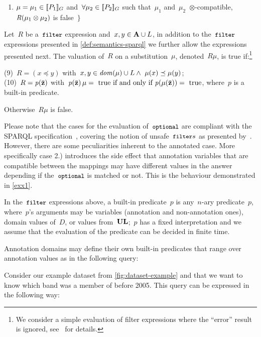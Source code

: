 \begin{definition}
\begin{center}
\begin{itemize}[noitemsep]
\begin{enumerate}[nosep]
      \item $\mu = \mu_1 \in [\![ P_1 ]\!]_{G}$ and~$\forall\mu_2 \in [\![ P_2 ]\!]_{G}$ such that~$\mu_1$
        and~$\mu_2$~$\otimes$-compatible,~$\mathit{R}\!\left(\mu_1\otimes\mu_2\right)$ is false~$\}$
      \end{enumerate}
    \end{itemize}
  \end{center}
  Let~$R$ be a~$\texttt{{\small filter}}$ expression and~$x,y \in \mathbf{A} \cup L$, in addition to the~$\texttt{{\small filter}}$ expressions presented in
  \cref{def:semantics-sparql} we further allow the expressions presented next.  The valuation of~$R$ on a
  substitution~$\mu$, denoted~$R\mu$, is true if:\footnote{We consider a simple evaluation of filter expressions where the
    ``error'' result is ignored, see~\citet[Section 11.3]{PrudhommeauxSeaborne:2008aa} for details.}
  
  \nd(9)~$R = (x \preceq y)$ with~$x,y \in \dom{\mu} \cup L \wedge\ \funcCall{\mu}{x} \preceq \funcCall{\mu}{y}$;\\
  (10)~$R = \mathit{p}\!\left(\bar{\mathbf z}\right)$ with~$\mathit{p}\!\left(\bar{\mathbf z}\right)\mu=\mbox{ true if and only if}\ \mathit{p}\!\left(\mathit{\mu}\!\left(\bar{\mathbf z}\right)\right) =\textrm{ true}$, where~$p$ is a built-in
  predicate.
  
  \noindent Otherwise~$R\mu$ is false.
\end{definition}

Please note that the cases for the evaluation of~$\texttt{{\small optional}}$ are compliant with the SPARQL
specification~\cite{PrudhommeauxSeaborne:2008aa}, covering the notion of unsafe~$\texttt{{\small filter}}{s}$ as presented
by~\citet{AnglesGutierrez:2008aa}.  However, there are some peculiarities inherent to the annotated case. More
specifically case 2.) introduces the side effect that annotation variables that are compatible between the mappings may
have different values in the answer depending if the~$\texttt{{\small optional}}$ is matched or not.  This is the behaviour demonstrated
in \cref{exx1}.

 In the~$\texttt{{\small filter}}$ expressions above, a built-in predicate~$p$ is any~$n$-ary predicate~$p$, where~$p$'s arguments may
be variables (annotation and non-annotation ones), domain values of~$D$, or values from~$\mathbf{UL}$;~$p$ has a fixed
interpretation and we assume that the evaluation of the predicate can be decided in finite time.

Annotation domains may define their own built-in predicates that range over annotation values as in the following query:
%
\begin{example}
  Consider our example dataset from \cref{fig:dataset-example} and that we want to know which band
   was a member of before 2005. This query can be expressed in the
  following way:
\end{example}

